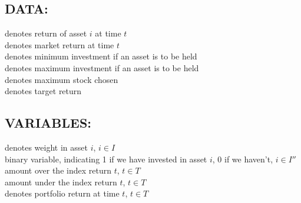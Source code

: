 \documentclass[12pt]{report}
\begin{document}
\subsection*{DATA:}
  denotes return of asset $i$ at time $t$\\
  denotes market return at time $t$\\
  denotes minimum investment if an asset is to be held\\
  denotes maximum investment if an asset is to be held\\
  denotes maximum stock chosen\\
  denotes target return\\




\subsection*{VARIABLES:}
  denotes weight in asset $i$, $i \in I$\\
  binary variable, indicating 1 if we have invested in asset $i$, 0 if we haven't, $i \in I''$\\
  amount over the index return $t$, $t \in T$\\
  amount under the index return $t$, $t \in T$\\
  denotes portfolio return at time $t$, $t \in T$\\
\end{document}
